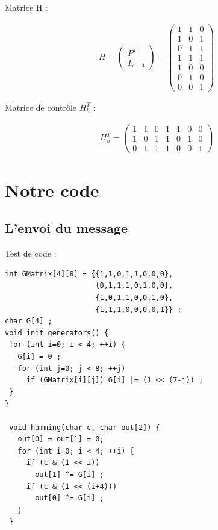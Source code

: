 Matrice H :

\begin{align*}
  H =
  \left(
    \begin{matrix}
      P^T \\
      I_{7-4}
    \end{matrix}
  \right)
  =
  \left(
    \begin{matrix}
      1 & 1 & 0 \\
      1 & 0 & 1 \\
      0 & 1 & 1 \\
      1 & 1 & 1 \\
      1 & 0 & 0 \\
      0 & 1 & 0 \\
      0 & 0 & 1
    \end{matrix}
  \right)
\end{align*}

Matrice de contrôle $H^T_h$ :

\begin{align*}
  H^T_h =
  \begin{pmatrix}
    1 & 1 & 0 & 1 & 1 & 0 & 0 \\
    1 & 0 & 1 & 1 & 0 & 1 & 0 \\
    0 & 1 & 1 & 1 & 0 & 0 & 1
  \end{pmatrix}
\end{align*}


\section{Notre code}
\label{sec:Notre code}

\subsection{L'envoi du message}
\label{sub:L'envoi du message}

Test de code :

\begin{verbatim}
int GMatrix[4][8] = {{1,1,0,1,1,0,0,0},
                     {0,1,1,1,0,1,0,0},
                     {1,0,1,1,0,0,1,0},
                     {1,1,1,0,0,0,0,1}} ;
char G[4] ;
void init_generators() {
 for (int i=0; i < 4; ++i) {
   G[i] = 0 ;
   for (int j=0; j < 8; ++j)
     if (GMatrix[i][j]) G[i] |= (1 << (7-j)) ;
 }
}

 void hamming(char c, char out[2]) {
   out[0] = out[1] = 0;
   for (int i=0; i < 4; ++i) {
     if (c & (1 << i))
       out[1] ^= G[i] ;
     if (c & (1 << (i+4)))
       out[0] ^= G[i] ;
   }
 }


\end{verbatim}


